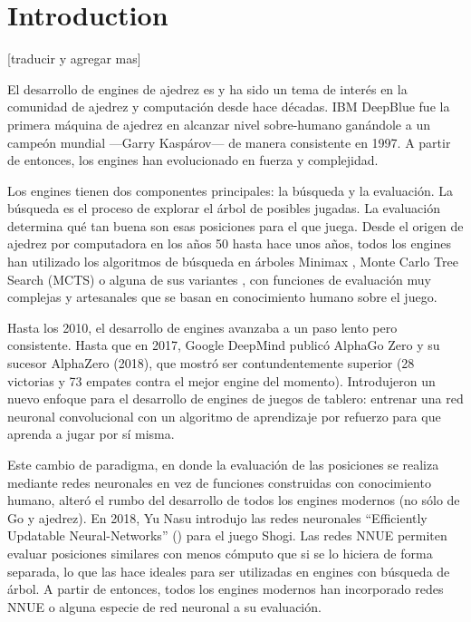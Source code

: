 \section{Introduction}



[traducir y agregar mas]

El desarrollo de engines de ajedrez es y ha sido un tema de interés en la comunidad de ajedrez y computación desde hace décadas. IBM DeepBlue \cite{deepblue:2002} fue la primera máquina de ajedrez en alcanzar nivel sobre-humano ganándole a un campeón mundial ---Garry Kaspárov--- de manera consistente en 1997. A partir de entonces, los engines han evolucionado en fuerza y complejidad.

Los engines tienen dos componentes principales: la búsqueda y la evaluación. La búsqueda es el proceso de explorar el árbol de posibles jugadas. La evaluación determina qué tan buena son esas posiciones para el que juega. Desde el origen de ajedrez por computadora en los años 50 hasta hace unos años, todos los engines han utilizado los algoritmos de búsqueda en árboles Minimax \cite{minimax-survey:1995}, Monte Carlo Tree Search \cite{mcts-survey:2012} (MCTS) o alguna de sus variantes \cite{tree-search-methods:2014,mcts-modifications:2022}, con funciones de evaluación muy complejas y artesanales que se basan en conocimiento humano sobre el juego.

Hasta los 2010, el desarrollo de engines avanzaba a un paso lento pero consistente. Hasta que en 2017, Google DeepMind publicó AlphaGo Zero \cite{alphagozero:2017} y su sucesor AlphaZero \cite{alphazero:2017,alphazero:2018} (2018), que mostró ser contundentemente superior (28 victorias y 73 empates contra el mejor engine del momento). Introdujeron un nuevo enfoque para el desarrollo de engines de juegos de tablero: entrenar una red neuronal convolucional con un algoritmo de aprendizaje por refuerzo para que aprenda a jugar por sí misma.

Este cambio de paradigma, en donde la evaluación de las posiciones se realiza mediante redes neuronales en vez de funciones construidas con conocimiento humano, alteró el rumbo del desarrollo de todos los engines modernos (no sólo de Go y ajedrez). En 2018, Yu Nasu introdujo las redes neuronales ``Efficiently Updatable Neural-Networks''  \cite{nnue:2018} () para el juego Shogi. Las redes NNUE permiten evaluar posiciones similares con menos cómputo que si se lo hiciera de forma separada, lo que las hace ideales para ser utilizadas en engines con búsqueda de árbol. A partir de entonces, todos los engines modernos han incorporado redes NNUE o alguna especie de red neuronal a su evaluación.

